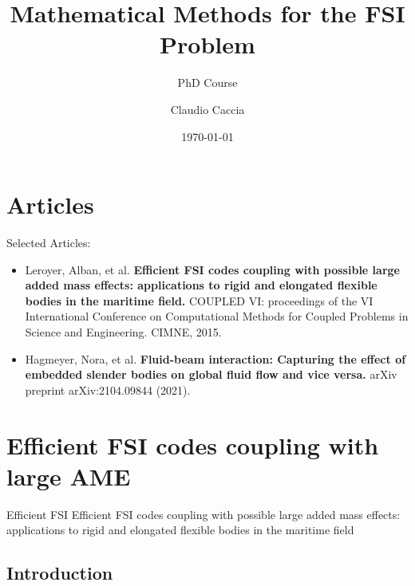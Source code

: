 \documentclass{beamer}
\title{Mathematical Methods for the FSI Problem}
\subtitle{PhD Course}
\author{Claudio Caccia}
\date{\today}
\begin{document}
\begin{frame}
    \maketitle
\end{frame}

\section{Articles}

\begin{frame}{Selected Articles:}
    
    \begin{itemize}
        \item Leroyer, Alban, et al. \textbf{Efficient FSI codes coupling with possible large added mass effects: applications to rigid and elongated flexible bodies in the maritime field.} COUPLED VI: proceedings of the VI International Conference on Computational Methods for Coupled Problems in Science and Engineering. CIMNE, 2015.
        \item Hagmeyer, Nora, et al. \textbf{Fluid-beam interaction: Capturing the effect of embedded slender bodies on global fluid flow and vice versa.} arXiv preprint arXiv:2104.09844 (2021).
    \end{itemize}
    
\end{frame}

\section{Efficient FSI codes coupling with large AME}



\begin{frame}{Efficient FSI}
\huge
\centering
Efficient FSI codes coupling with possible large added mass effects: \\
applications to rigid and elongated flexible bodies in the maritime field
    
\end{frame}

\subsection{Introduction}
\end{document}
